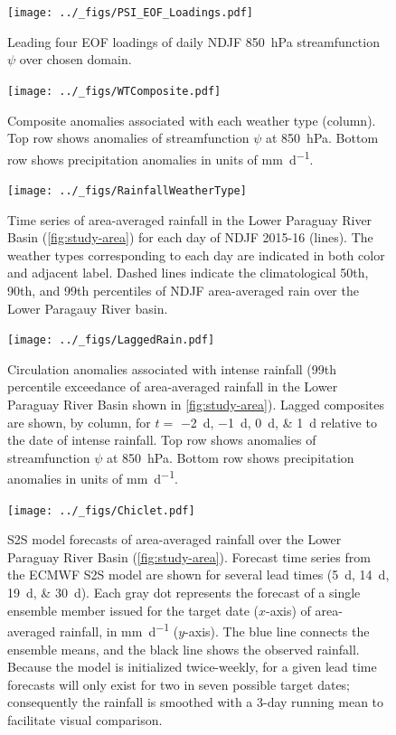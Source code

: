 \documentclass[twocol]{ametsoc}
\begin{document}
\begin{figure}
	\noindent\texttt{[image: ../\_figs/PSI\_EOF\_Loadings.pdf]}
	\caption{
    	Leading four EOF loadings of daily NDJF \SI{850}{\hecto\pascal} streamfunction $\psi$ over chosen domain.
	}
  \label{fig:eof-loading}
\end{figure}

\begin{figure}
	\noindent\texttt{[image: ../\_figs/WTComposite.pdf]}
	\caption{
		Composite anomalies associated with each weather type (column).
    Top row shows anomalies of streamfunction $\psi$ at \SI{850}{\hecto\pascal}.
    Bottom row shows precipitation anomalies in units of \si{\milli\meter\per\day}.
	}
	\label{fig:wt-composite}
\end{figure}

\begin{figure}
	\noindent\texttt{[image: ../\_figs/RainfallWeatherType]}
	\caption{
		Time series of area-averaged rainfall in the Lower Paraguay River Basin (\cref{fig:study-area}) for each day of NDJF  2015-16 (lines).
		The weather types corresponding to each day are indicated in both color and adjacent label.
		Dashed lines indicate the climatological 50th, 90th, and 99th percentiles of NDJF area-averaged rain over the Lower Paragauy River basin.
	}
  \label{fig:rain-wt}
\end{figure}

\begin{figure}	\noindent\texttt{[image: ../\_figs/LaggedRain.pdf]}
	\caption{
		Circulation anomalies associated with intense rainfall (99th percentile exceedance of area-averaged rainfall in the Lower Paraguay River Basin shown in \cref{fig:study-area}).
		Lagged composites are shown, by column, for $t = $ \SIlist{-2;-1;0;1}{\day} relative to the date of intense rainfall.
		Top row shows anomalies of streamfunction $\psi$ at \SI{850}{\hecto\pascal}.
    Bottom row shows precipitation anomalies in units of \si{\milli\meter\per\day}.
	}
  \label{fig:lagged-rain}
\end{figure}

\begin{figure}
	\noindent\texttt{[image: ../\_figs/Chiclet.pdf]}
	\caption{
    S2S model forecasts of area-averaged rainfall over the Lower Paraguay River Basin (\cref{fig:study-area}).
    Forecast time series from the ECMWF S2S model are shown for several lead times (\SIlist{5;14;19;30}{\day}).
		Each gray dot represents the forecast of a single ensemble member issued for the target date ($x$-axis) of area-averaged rainfall, in \si{\milli\meter\per\day} ($y$-axis).
		The blue line connects the ensemble means, and the black line shows the observed rainfall.
		Because the model is initialized twice-weekly, for a given lead time forecasts will only exist for two in seven possible target dates;  consequently the rainfall is smoothed with a 3-day running mean to facilitate visual comparison.
	}
  \label{fig:chiclet}
\end{figure}
\end{document}
